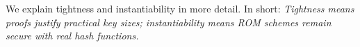
We explain tightness and instantiability in more detail. In short: \emph{Tightness means proofs justify practical key sizes; instantiability means ROM schemes remain secure with real hash functions.} 

